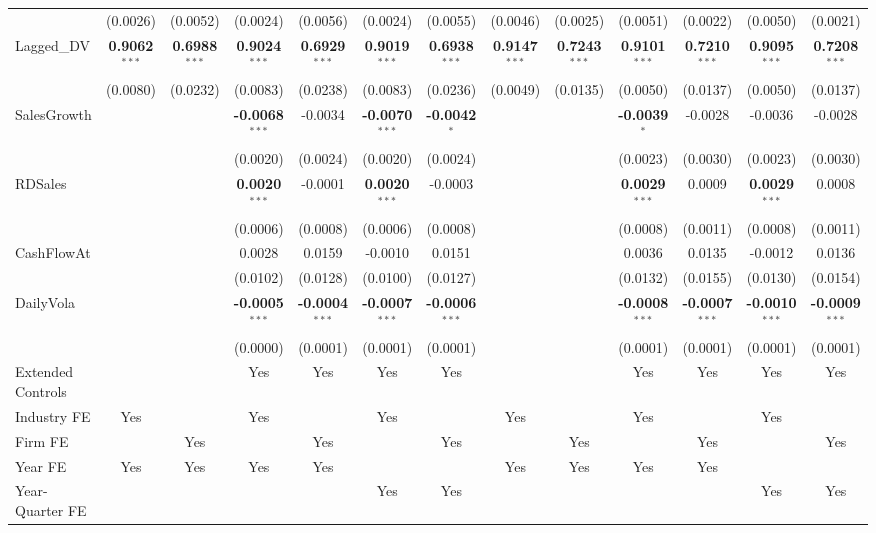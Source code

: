\begin{landscape}
\begin{table}[H]
\begin{tabular}{lcccccccccccc}
 & (0.0026) & (0.0052) & (0.0024) & (0.0056) & (0.0024) & (0.0055) & (0.0046) & (0.0025) & (0.0051) & (0.0022) & (0.0050) & (0.0021) \\
Lagged\_DV & \textbf{0.9062}$^{***}$ & \textbf{0.6988}$^{***}$ & \textbf{0.9024}$^{***}$ & \textbf{0.6929}$^{***}$ & \textbf{0.9019}$^{***}$ & \textbf{0.6938}$^{***}$ & \textbf{0.9147}$^{***}$ & \textbf{0.7243}$^{***}$ & \textbf{0.9101}$^{***}$ & \textbf{0.7210}$^{***}$ & \textbf{0.9095}$^{***}$ & \textbf{0.7208}$^{***}$ \\
 & (0.0080) & (0.0232) & (0.0083) & (0.0238) & (0.0083) & (0.0236) & (0.0049) & (0.0135) & (0.0050) & (0.0137) & (0.0050) & (0.0137) \\
SalesGrowth &  &  & \textbf{-0.0068}$^{***}$ & -0.0034 & \textbf{-0.0070}$^{***}$ & \textbf{-0.0042}$^{*}$ &  &  & \textbf{-0.0039}$^{*}$ & -0.0028 & -0.0036 & -0.0028 \\
 &  &  & (0.0020) & (0.0024) & (0.0020) & (0.0024) &  &  & (0.0023) & (0.0030) & (0.0023) & (0.0030) \\
RDSales &  &  & \textbf{0.0020}$^{***}$ & -0.0001 & \textbf{0.0020}$^{***}$ & -0.0003 &  &  & \textbf{0.0029}$^{***}$ & 0.0009 & \textbf{0.0029}$^{***}$ & 0.0008 \\
 &  &  & (0.0006) & (0.0008) & (0.0006) & (0.0008) &  &  & (0.0008) & (0.0011) & (0.0008) & (0.0011) \\
CashFlowAt &  &  & 0.0028 & 0.0159 & -0.0010 & 0.0151 &  &  & 0.0036 & 0.0135 & -0.0012 & 0.0136 \\
 &  &  & (0.0102) & (0.0128) & (0.0100) & (0.0127) &  &  & (0.0132) & (0.0155) & (0.0130) & (0.0154) \\
DailyVola &  &  & \textbf{-0.0005}$^{***}$ & \textbf{-0.0004}$^{***}$ & \textbf{-0.0007}$^{***}$ & \textbf{-0.0006}$^{***}$ &  &  & \textbf{-0.0008}$^{***}$ & \textbf{-0.0007}$^{***}$ & \textbf{-0.0010}$^{***}$ & \textbf{-0.0009}$^{***}$ \\
 &  &  & (0.0000) & (0.0001) & (0.0001) & (0.0001) &  &  & (0.0001) & (0.0001) & (0.0001) & (0.0001) \\
\midrule
Extended Controls &  &  & Yes & Yes & Yes & Yes &  &  & Yes & Yes & Yes & Yes \\
Industry FE & Yes &  & Yes &  & Yes &  & Yes &  & Yes &  & Yes &  \\
Firm FE &  & Yes &  & Yes &  & Yes &  & Yes &  & Yes &  & Yes \\
Year FE & Yes & Yes & Yes & Yes &  &  & Yes & Yes & Yes & Yes &  &  \\
Year-Quarter FE &  &  &  &  & Yes & Yes &  &  &  &  & Yes & Yes \\

\end{tabular}
\end{table}
\end{landscape}
